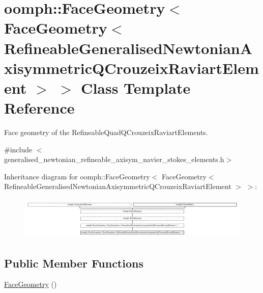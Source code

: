 \hypertarget{classoomph_1_1FaceGeometry_3_01FaceGeometry_3_01RefineableGeneralisedNewtonianAxisymmetricQCrouzeixRaviartElement_01_4_01_4}{}\section{oomph\+:\+:Face\+Geometry$<$ Face\+Geometry$<$ Refineable\+Generalised\+Newtonian\+Axisymmetric\+Q\+Crouzeix\+Raviart\+Element $>$ $>$ Class Template Reference}
\label{classoomph_1_1FaceGeometry_3_01FaceGeometry_3_01RefineableGeneralisedNewtonianAxisymmetricQCrouzeixRaviartElement_01_4_01_4}


Face geometry of the Refineable\+Quad\+Q\+Crouzeix\+Raviart\+Elements.  




{\ttfamily \#include $<$generalised\+\_\+newtonian\+\_\+refineable\+\_\+axisym\+\_\+navier\+\_\+stokes\+\_\+elements.\+h$>$}

Inheritance diagram for oomph\+:\+:Face\+Geometry$<$ Face\+Geometry$<$ Refineable\+Generalised\+Newtonian\+Axisymmetric\+Q\+Crouzeix\+Raviart\+Element $>$ $>$\+:\begin{figure}[H]
\begin{center}
\leavevmode
\includegraphics[height=2.052786cm]{classoomph_1_1FaceGeometry_3_01FaceGeometry_3_01RefineableGeneralisedNewtonianAxisymmetricQCrouzeixRaviartElement_01_4_01_4}
\end{center}
\end{figure}
\subsection*{Public Member Functions}
\begin{DoxyCompactItemize}
\item 
\hyperlink{classoomph_1_1FaceGeometry_3_01FaceGeometry_3_01RefineableGeneralisedNewtonianAxisymmetricQCrouzeixRaviartElement_01_4_01_4_af8eb7eed4de0f464ba33c2b9812d4052}{Face\+Geometry} ()
\end{DoxyCompactItemize}
